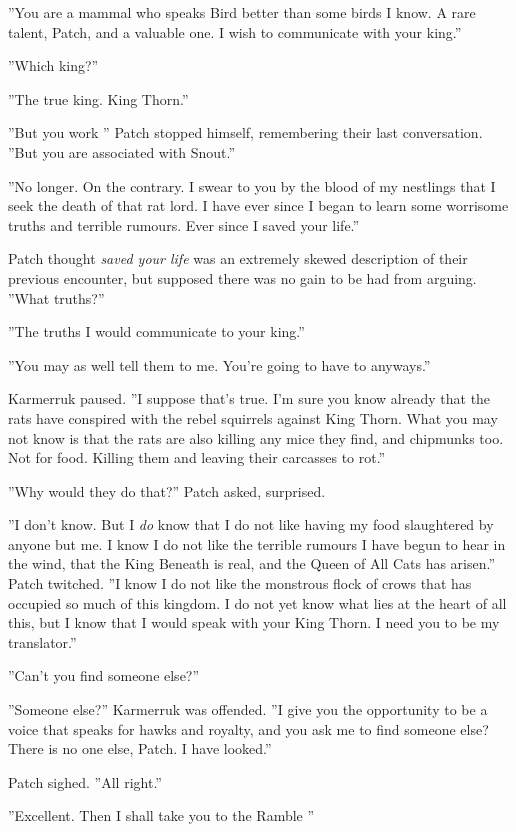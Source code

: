 \documentclass[12pt]{book}
\begin{document}
''You are a mammal who speaks Bird better than some birds I know. A rare talent, Patch, and a valuable one. I wish to communicate with your king.''

''Which king?''

''The true king. King Thorn.''

''But you work %
'' Patch stopped himself, remembering their last conversation. ''But you are associated with Snout.''

''No longer. On the contrary. I swear to you by the blood of my nestlings that I seek the death of that rat lord. I have ever since I began to learn some worrisome truths and terrible rumours. Ever since I saved your life.''

Patch thought {\it saved your life} was an extremely skewed description of their previous encounter, but supposed there was no gain to be had from arguing. ''What truths?''

''The truths I would communicate to your king.''

''You may as well tell them to me. You're going to have to anyways.''

Karmerruk paused. ''I suppose that's true. I'm sure you know already that the rats have conspired with the rebel squirrels against King Thorn. What you may not know is that the rats are also killing any mice they find, and chipmunks too. Not for food. Killing them and leaving their carcasses to rot.''

''Why would they do that?'' Patch asked, surprised.

''I don't know. But I {\it do} know that I do not like having my food slaughtered by anyone but me. I know I do not like the terrible rumours I have begun to hear in the wind, that the King Beneath is real, and the Queen of All Cats has arisen.'' Patch twitched. ''I know I do not like the monstrous flock of crows that has occupied so much of this kingdom. I do not yet know what lies at the heart of all this, but I know that I would speak with your King Thorn. I need you to be my translator.''

''Can't you find someone else?''

''Someone else?'' Karmerruk was offended. ''I give you the opportunity to be a voice that speaks for hawks and royalty, and you ask me to find someone else? There is no one else, Patch. I have looked.''

Patch sighed. ''All right.''

''Excellent. Then I shall take you to the Ramble %
''
\end{document}
